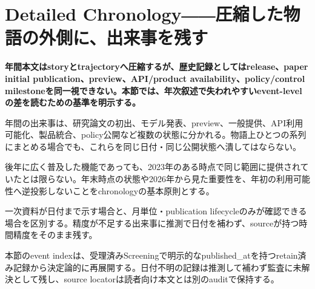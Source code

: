 \section{Detailed Chronology――圧縮した物語の外側に、出来事を残す}
\noindent\textbf{年間本文はstoryとtrajectoryへ圧縮するが、歴史記録としてはrelease、paper initial publication、preview、API/product availability、policy/control milestoneを同一視できない。本節では、年次叙述で失われやすいevent-levelの差を読むための基準を明示する。}

年間の出来事は、研究論文の初出、モデル発表、preview、一般提供、API利用可能化、製品統合、policy公開など複数の状態に分かれる。物語上ひとつの系列にまとめる場合でも、これらを同じ日付・同じ公開状態へ潰してはならない。


後年に広く普及した機能であっても、2023年のある時点で同じ範囲に提供されていたとは限らない。年末時点の状態や2026年から見た重要性を、年初の利用可能性へ逆投影しないことをchronologyの基本原則とする。


一次資料が日付まで示す場合と、月単位・publication lifecycleのみが確認できる場合を区別する。精度が不足する出来事に推測で日付を補わず、sourceが持つ時間精度をそのまま残す。


本節のevent indexは、受理済みScreeningで明示的なpublished\_atを持つretain済み記録から決定論的に再展開する。日付不明の記録は推測して補わず監査に未解決として残し、source locatorは読者向け本文とは別のauditで保持する。
